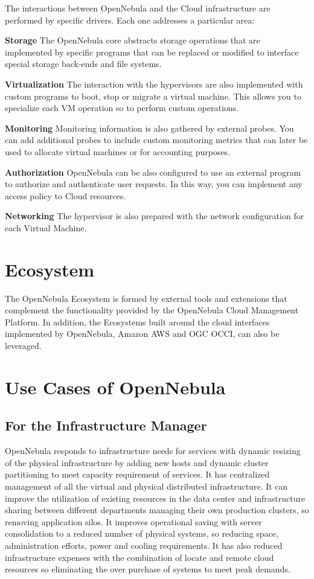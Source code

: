 \documentclass[9pt,twocolumn,twoside]{../../styles/osajnl}
\begin{document}
The interactions between OpenNebula and the {Cloud 
infrastructure}\cite{www-opennebula-infraintegration} are 
performed by specific drivers. Each one addresses a particular area:

\textbf{Storage} The OpenNebula core abstracts storage 
operations that are implemented by specific programs that can be 
replaced or modified to interface special storage back-ends and file 
systems.

\textbf{Virtualization} The interaction with the hypervisors are also 
implemented with custom programs to boot, stop or migrate a virtual 
machine. This allows you to specialize each VM operation so to 
perform custom operations.

\textbf{Monitoring} Monitoring information is also gathered by 
external probes. You can add additional probes to include custom 
monitoring metrics that can later be used to allocate virtual 
machines or for accounting purposes.

\textbf{Authorization} OpenNebula can be also configured to use an 
external program to authorize and authenticate user requests. In this 
way, you can implement any access policy to Cloud resources.

\textbf{Networking} The hypervisor is also prepared with the network 
configuration for each Virtual Machine.

\section{Ecosystem}

The {OpenNebula Ecosystem}\cite{www-opennebula-ecosystem} is formed 
by external tools and extensions 
that complement the functionality provided by the OpenNebula Cloud 
Management Platform. In addition, the Ecosystems built around the 
cloud interfaces implemented by OpenNebula, Amazon AWS and OGC OCCI, 
can also be leveraged. 

\section{Use Cases of OpenNebula}

\subsection{For the Infrastructure Manager}

OpenNebula responds to infrastructure needs for services with 
dynamic resizing of the physical infrastructure by adding new hosts 
and dynamic cluster partitioning to meet capacity requirement of 
services. It has centralized management of all the virtual and 
physical distributed infrastructure. It can improve the utilization 
of existing resources in the data center and infrastructure sharing 
between different departments managing their own production clusters, 
so removing application silos. It improves operational saving with 
server consolidation to a reduced number of physical systems, so 
reducing space, administration efforts, power and cooling 
requirements. It has also reduced infrastructure expenses with the 
combination of locate and remote cloud resources so eliminating the 
over purchase of systems to meet peak demands.
\end{document}
